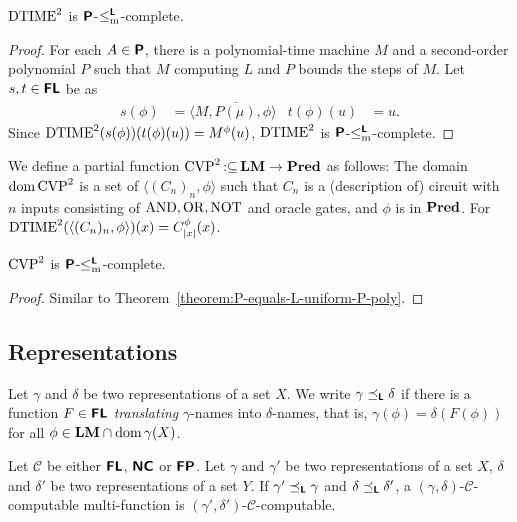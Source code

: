 \documentclass[envcountsame,orivec,oribibl]{llncs}
\newcommand{\pcolon}{\mathpunct{\,:\subseteq}}
\begin{document}
\begin{lemma}
 $\mathrm{DTIME}^2$ is $\text{\bfseries \sffamily \upshape P}$-$\leq _{\mathrm{m}} ^{\text{\bfseries \sffamily \upshape L}}$-complete.
\end{lemma}

\begin{proof}
 For each $A \in \text{\bfseries \sffamily \upshape P}$, there is a polynomial-time machine $M$ and a second-order polynomial $P$ such that $M$ computing $L$ and $P$ bounds the steps of $M$.
 Let $s, t \in \text{\bfseries \sffamily \upshape FL}$ be as
 \begin{align}
  s(\phi) &= \langle M, \overline{P(\mu)}, \phi \rangle
  &
  t(\phi)(u) &= u.
 \end{align}
 Since  $\mathrm{DTIME}^2(s(\phi))(t(\phi)(u)) = M^\phi (u)$,
 $\mathrm{DTIME}^2$ is $\text{\bfseries \sffamily \upshape P}$-$\leq _{\mathrm{m}} ^{\text{\bfseries \sffamily \upshape L}}$-complete.
\end{proof}


We define a partial function  $\probCVPtwo \pcolon \LM \to \Pred$ as follows:
The domain $\mathop{\rm dom} \mathrm{CVP}^2$ is a set of $\langle (C_n)_n, \phi \rangle$
such that $C_n$ is a (description of) circuit with $n$ inputs consisting of $\mathrm{AND}, \mathrm{OR}, \mathrm{NOT}$ and oracle gates, and $\phi$ is in $\mathbf{Pred}$.
For $\mathrm{DTIME}^2(\langle (C_n)_n,  \phi \rangle)(x) = C^\phi_{|x|}(x)$.

\begin{lemma}
 $\mathrm{CVP}^2$ is $\text{\bfseries \sffamily \upshape P}$-$\leq _{\mathrm{m}} ^{\text{\bfseries \sffamily \upshape L}}$-complete.
\end{lemma}

\begin{proof}
Similar to Theorem~\ref{theorem:P-equals-L-uniform-P-poly}.
\end{proof}



\subsection{Representations}
\newcommand{\transL}{\preceq_\classLtwo}


\begin{definition}
Let $\gamma$ and $\delta$ be two representations of a set $X$.
We write $\gamma \transL \delta$ if
there is a function $F \in \text{\bfseries \sffamily \upshape FL}$ \emph{translating} $\gamma$-names
into $\delta$-names, that is, $\gamma(\phi) = \delta(F(\phi))$ 
for all $\phi \in \mathbf{LM} \cap \mathop{\rm dom} \gamma(X)$.
\end{definition}

\begin{lemma}
 Let $\mathcal{C}$ be either $\text{\bfseries \sffamily \upshape FL}$, $\text{\bfseries \sffamily \upshape NC}$ or
 $\text{\bfseries \sffamily \upshape FP}$.
 Let $\gamma$ and $\gamma'$ be two representations of a set $X$, 
 $\delta$ and $\delta'$ be two representations of a set $Y$.
 If $\gamma' \transL \gamma$ and $\delta \transL \delta'$,
 a $(\gamma, \delta)$-$\mathcal C$-computable multi-function is
 $(\gamma', \delta')$-$\mathcal C$-computable.
\end{lemma}
\end{document}
